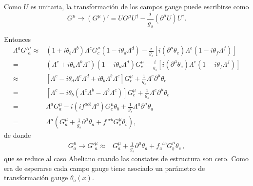 \begin{frame}
Como $U$ es unitaria, la transformación de los campos gauge puede escribirse como
\begin{equation}
    {G}^\mu\to\left({G}^\mu\right)'=U{G}^\mu U^{\dagger}-\frac{i}{g_s}\left(\partial^\mu U\right)U^\dagger.
\end{equation}

Entonces
\begin{align}
\label{eq:Gmuinv}
  \Lambda^a{G'}^\mu_a\approx&(1+i\theta_b\Lambda^b)\Lambda^cG^\mu_c(1-i\theta_d\Lambda^d)-\frac{i}{g_s}[i(\partial^\mu\theta_e)\Lambda^e(1-i\theta_f\Lambda^f)]\nonumber\\
  =&(\Lambda^c+i\theta_b\Lambda^b\Lambda^c)(1-i\theta_d\Lambda^d)G^\mu_c-\frac{i}{g_s}[i(\partial^\mu\theta_e)\Lambda^e(1-i\theta_f\Lambda^f)]\nonumber\\
  \approx&[\Lambda^c-i\theta_d\Lambda^c\Lambda^d+i\theta_b\Lambda^b\Lambda^c]G^\mu_c+\frac{1}{g_s}\Lambda^e\partial^\mu\theta_e\nonumber\\
  =&[\Lambda^c-i\theta_b(\Lambda^c\Lambda^b-\Lambda^b\Lambda^c)]G^\mu_c+\frac{1}{g_s}\Lambda^e\partial^\mu\theta_e\nonumber\\
  =&\Lambda^aG^\mu_a-i(i f^{acb}\Lambda^a)G^\mu_c\theta_b+\frac{1}{g_s}\Lambda^a\partial^\mu\theta_a\nonumber\\
  =&\Lambda^a\left(G^\mu_a+\frac{1}{g_s}\partial^\mu\theta_a+f^{acb}G^\mu_c\theta_b\right),
\end{align}
de donde
\begin{align}
  \label{eq:gmutrinf}
  G^\mu_a\to {G'}^\mu_a\approx&G^\mu_a+\frac{1}{g_s}\partial^\mu\theta_a+{f_a}^{bc}G^\mu_b\theta_c\,,
\end{align}
que se reduce al caso Abeliano cuando las constates de estructura son cero. Como era de esperarse cada campo gauge tiene asociado un parámetro de transformación gauge $\theta_a(x)$.
\end{frame}

